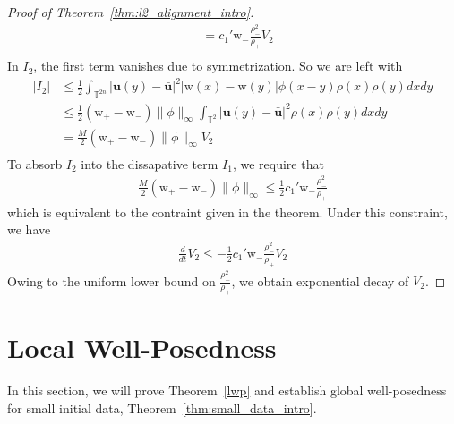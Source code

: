 \documentclass[11pt,letterpaper]{amsart}
\theoremstyle{plain}
\theoremstyle{definition}
\theoremstyle{remark}
\newcommand{\thm}[1]{Theorem~\ref{#1}}
\newcommand{\T}{\ensuremath{\mathbb{T}}}   %
\renewcommand{\leq}{\leqslant}
\def\T{\mathbb{T}}
\def\u{\textbf{u}}
\def \wt {\mathrm{w}}
\begin{document}
\begin{proof}[Proof of \thm{thm:l2_alignment_intro}]
\begin{align*}
        &= c_1' \wt_- \frac{\rho_-^2}{\rho_+} V_2 \\            
    \end{align*}
    In $I_2$, the first term vanishes due to symmetrization.  So we are left with 
    \begin{align*}
        |I_2| 
            &\leq \frac{1}{2}  \int_{\T^{2n}} |\u(y) - \bar{\u}|^2 |\wt(x)-\wt(y)| \phi(x-y) \rho(x) \rho(y) dx dy \\
            &\leq \frac{1}{2} (\wt_+ - \wt_-) \|\phi\|_{\infty} \int_{\T^2} |\u(y) - \bar{\u}|^2 \rho(x) \rho(y) dx dy \\
            &= \frac{M}{2} (\wt_+ - \wt_-) \|\phi\|_{\infty} V_2 \\
    \end{align*}
    To absorb $I_2$ into the dissapative term $I_1$, we require that 
    \begin{align*}
        \frac{M}{2} (\wt_+ - \wt_-) \|\phi\|_{\infty} \leq \frac{1}{2} c_1' \wt_- \frac{\rho_-^2}{\rho_+} 
    \end{align*}
    which is equivalent to the contraint given in the theorem. 
    Under this constraint, we have 
    \begin{align*}
        \frac{d}{dt} V_2 \leq - \frac{1}{2} c_1' \wt_- \frac{\rho_-^2}{\rho_+} V_2 
    \end{align*}
    Owing to the uniform lower bound on $\frac{\rho_-^2}{\rho_+}$, we obtain exponential decay of $V_2$. 
\end{proof}








\section{Local Well-Posedness}
\label{LWP}
In this section, we will prove \thm{lwp} and establish global well-posedness for small initial data, \thm{thm:small_data_intro}.
\end{document}
